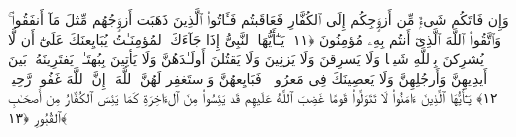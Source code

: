  وَإِن فَاتَكُم شَىءٌۭ مِّن أَزوَٟجِكُم إِلَى ٱلكُفَّارِ فَعَاقَبتُم فَـَٔاتُوا۟ ٱلَّذِينَ ذَهَبَت أَزوَٟجُهُم مِّثلَ مَآ أَنفَقُوا۟ ۚ وَٱتَّقُوا۟ ٱللَّهَ ٱلَّذِىٓ أَنتُم بِهِۦ مُؤمِنُونَ ﴿١١﴾
 يَـٰٓأَيُّهَا ٱلنَّبِىُّ إِذَا جَآءَكَ ٱلمُؤمِنَـٰتُ يُبَايِعنَكَ عَلَىٰٓ أَن لَّا يُشرِكنَ بِٱللَّهِ شَيـًۭٔا وَلَا يَسرِقنَ وَلَا يَزنِينَ وَلَا يَقتُلنَ أَولَـٰدَهُنَّ وَلَا يَأتِينَ بِبُهتَـٰنٍۢ يَفتَرِينَهُۥ بَينَ أَيدِيهِنَّ وَأَرجُلِهِنَّ وَلَا يَعصِينَكَ فِى مَعرُوفٍۢ ۙ فَبَايِعهُنَّ وَٱستَغفِر لَهُنَّ ٱللَّهَ ۖ إِنَّ ٱللَّهَ غَفُورٌۭ رَّحِيمٌۭ ﴿١٢﴾
 يَـٰٓأَيُّهَا ٱلَّذِينَ ءَامَنُوا۟ لَا تَتَوَلَّوا۟ قَومًا غَضِبَ ٱللَّهُ عَلَيهِم قَد يَئِسُوا۟ مِنَ ٱلءَاخِرَةِ كَمَا يَئِسَ ٱلكُفَّارُ مِن أَصحَـٰبِ ٱلقُبُورِ ﴿١٣﴾
 
